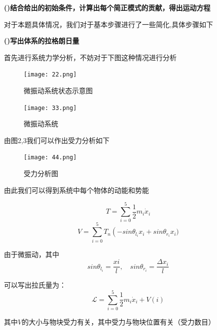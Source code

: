 \documentclass[11pt, a4paper, oneside]{ctexart}
\begin{document}
{\textbf{()结合给出的初始条件，计算出每个简正模式的贡献，得出运动方程}

\vspace{5mm}
对于本题具体情况，我们对于基本步骤进行了一些简化,具体步骤如下

\vspace{5mm}
\textbf{()写出体系的拉格朗日量}
\vspace{5mm}

首先进行系统力学分析，不妨对于下图这种情况进行分析
\begin{figure}[h]
	
    \centering
    \vspace{4mm}
    \texttt{[image: 22.png]}
    \caption{微振动系统状态示意图}
\end{figure} 



\begin{figure}[h]
	
    \centering
    \vspace{4mm}
    \texttt{[image: 33.png]}
    \caption{微振动系统}
\end{figure} 

由图2,3我们可以作出受力分析如下

\begin{figure}[h]
	
    \centering
    \vspace{4mm}
    \texttt{[image: 44.png]}
    \caption{受力分析图}
\end{figure} 

由此我们可以得到系统中每个物体的动能和势能

\begin{equation}
    T = \sum_{i=0}^5\frac{1}{2}m_i\dot{x}_i
\end{equation}
\begin{equation}
    V = \sum_{i=0}^5T_n\left(-sin\theta_{l_i}x_i+sin\theta_{r_i}x_i\right.)
\end{equation}

由于微振动，其中
\begin{equation}
    sin\theta_{l_i}=\frac{xi}{l},\quad sin\theta_{r_i}=\frac{\Delta x_i}{l}
\end{equation}

可以写出拉氏量为：
\begin{equation}
    \mathscr{L}=\sum_{i=0}^5\frac{1}{2}m_i\dot{x}_i+V(i)
\end{equation}

其中$V$的大小与物块受力有关，其中受力与物块位置有关（受力数目）

}
\end{document}
